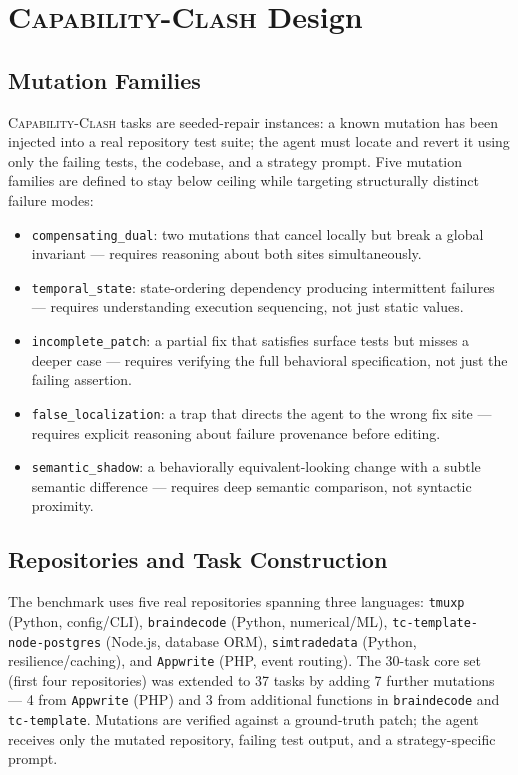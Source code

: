 \documentclass[sigconf,review,anonymous]{acmart}
\newcommand{\ccbench}{\textsc{Capability-Clash}}
\begin{document}
\section{\ccbench{} Design}
\label{sec:cc}

\subsection{Mutation Families}

\ccbench{} tasks are seeded-repair instances: a known mutation has been injected into a real repository test suite; the agent must locate and revert it using only the failing tests, the codebase, and a strategy prompt. Five mutation families are defined to stay below ceiling while targeting structurally distinct failure modes:

\begin{itemize}[itemsep=2pt]
  \item \texttt{compensating\_dual}: two mutations that cancel locally but break a global invariant — requires reasoning about both sites simultaneously.
  \item \texttt{temporal\_state}: state-ordering dependency producing intermittent failures — requires understanding execution sequencing, not just static values.
  \item \texttt{incomplete\_patch}: a partial fix that satisfies surface tests but misses a deeper case — requires verifying the full behavioral specification, not just the failing assertion.
  \item \texttt{false\_localization}: a trap that directs the agent to the wrong fix site — requires explicit reasoning about failure provenance before editing.
  \item \texttt{semantic\_shadow}: a behaviorally equivalent-looking change with a subtle semantic difference — requires deep semantic comparison, not syntactic proximity.
\end{itemize}

\subsection{Repositories and Task Construction}

The benchmark uses five real repositories spanning three languages: \texttt{tmuxp} (Python, config/CLI), \texttt{braindecode} (Python, numerical/ML), \texttt{tc-template-node-postgres} (Node.js, database ORM), \texttt{simtradedata} (Python, resilience/caching), and \texttt{Appwrite} (PHP, event routing). The 30-task core set (first four repositories) was extended to 37 tasks by adding 7 further mutations — 4 from \texttt{Appwrite} (PHP) and 3 from additional functions in \texttt{braindecode} and \texttt{tc-template}. Mutations are verified against a ground-truth patch; the agent receives only the mutated repository, failing test output, and a strategy-specific prompt.
\end{document}
